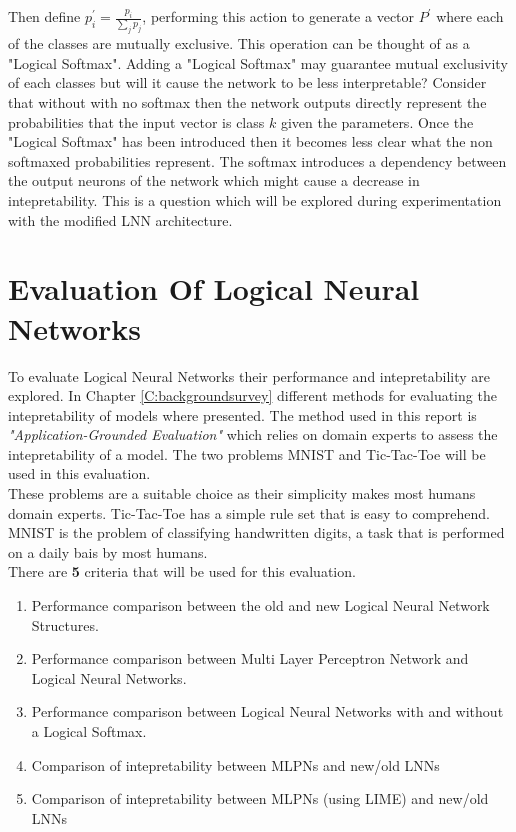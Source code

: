  Then define $p_i^{'} = \frac{p_i}{\sum_j p_j}$, performing this action to generate a vector $P^{'}$ where each of the classes are mutually exclusive. This operation can be thought of as a "Logical Softmax". Adding a "Logical Softmax" may guarantee mutual exclusivity of each classes but will it cause the network to be less interpretable? Consider that without with no softmax then the network outputs directly represent the probabilities that the input vector is class $k$ given the parameters. Once the "Logical Softmax" has been introduced then it becomes less clear what the non softmaxed probabilities represent. The softmax introduces a dependency between the output neurons of the network which might cause a decrease in intepretability. This is a question which will be explored during experimentation with the modified LNN architecture.

\chapter{Evaluation Of Logical Neural Networks} \label{C:evaluation-lnn}
To evaluate Logical Neural Networks their performance and intepretability are explored. In Chapter \ref{C:backgroundsurvey} different methods for evaluating the intepretability of models where presented. The method used in this report is \textit{"Application-Grounded Evaluation"} \cite{doshi2017towards} which relies on domain experts to assess the intepretability of a model. The two problems MNIST \cite{mnistlecun} and Tic-Tac-Toe \cite{Lichman:2013} will be used in this evaluation.\\

These problems are a suitable choice as their simplicity makes most humans domain experts. Tic-Tac-Toe has a simple rule set that is easy to comprehend. MNIST is the problem of classifying handwritten digits, a task that is performed on a daily bais by most humans.\\

There are \textbf{5} criteria that will be used for this evaluation.

\begin{enumerate}
	\item Performance comparison between the old and new Logical Neural Network Structures.
	\item Performance comparison between Multi Layer Perceptron Network and Logical Neural Networks.
	\item Performance comparison between Logical Neural Networks with and without a Logical Softmax.
	\item Comparison of intepretability between MLPNs and new/old LNNs
	\item Comparison of intepretability between MLPNs (using LIME) and new/old LNNs
\end{enumerate}

